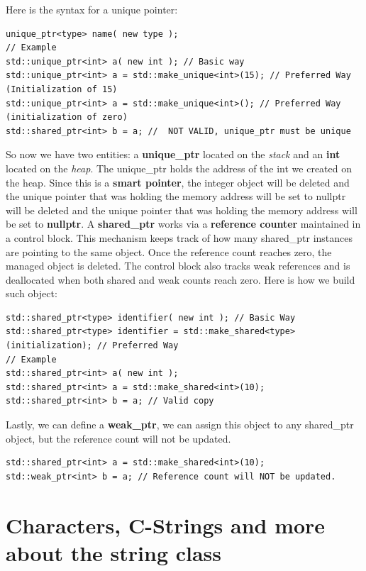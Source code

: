 \documentclass{report}
\begin{document}
    \pagebreak \bigbreak \noindent 
    Here is the syntax for a unique pointer:
    \bigbreak \noindent 
    \sepline
    \begin{verbatim}
unique_ptr<type> name( new type );
// Example
std::unique_ptr<int> a( new int ); // Basic way 
std::unique_ptr<int> a = std::make_unique<int>(15); // Preferred Way (Initialization of 15)
std::unique_ptr<int> a = std::make_unique<int>(); // Preferred Way (initialization of zero)
std::shared_ptr<int> b = a; //  NOT VALID, unique_ptr must be unique
    \end{verbatim}
    \sepline
    \bigbreak \noindent 
    So now we have two entities: a \textbf{unique\_ptr} located on the \textit{stack} and an \textbf{int} located on the \textit{heap}. The unique\_ptr holds the address of the int we created on the heap. Since this is a \textbf{smart pointer}, the integer object will be deleted and the unique pointer that was holding the memory address will be set to nullptr will be deleted and the unique pointer that was holding the memory address will be set to \textbf{nullptr}.
    \bigbreak \noindent 
    A \textbf{shared\_ptr} works via a \textbf{reference counter} maintained in a control block. This mechanism keeps track of how many shared\_ptr instances are pointing to the same object. Once the reference count reaches zero, the managed object is deleted. The control block also tracks weak references and is deallocated when both shared and weak counts reach zero. Here is how we build such object:
    \bigbreak \noindent 
    \sepline
    \begin{verbatim}
std::shared_ptr<type> identifier( new int ); // Basic Way
std::shared_ptr<type> identifier = std::make_shared<type>(initialization); // Preferred Way
// Example
std::shared_ptr<int> a( new int );
std::shared_ptr<int> a = std::make_shared<int>(10);
std::shared_ptr<int> b = a; // Valid copy
    \end{verbatim}
    \sepline

    \bigbreak \noindent 
    Lastly, we can define a \textbf{weak\_ptr}, we can assign this object to any shared\_ptr object, but the reference count will not be updated.
    \bigbreak \noindent 
    \sepline
    \begin{verbatim}
std::shared_ptr<int> a = std::make_shared<int>(10);
std::weak_ptr<int> b = a; // Reference count will NOT be updated.
    \end{verbatim}
    \sepline

    \pagebreak \bigbreak \noindent 
    \section{\LARGE Characters, C-Strings and more about the string class}
    \bigbreak \noindent 
\end{document}
